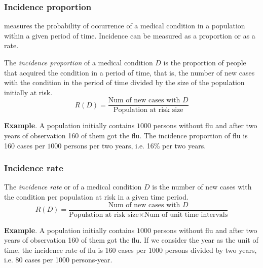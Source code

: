\begin{frame}
\frametitle{Incidence proportion}
 measures the probability of occurrence of a medical condition in a population within a given period of time.
Incidence can be measured as a proportion or as a rate.

\begin{definition}
The \emph{incidence proportion} of a medical condition $D$ is the proportion of people that acquired the condition in a period of time, that is, the number of new cases with the condition in the period of time divided by the size of the population initially at risk.
\[
  R(D)=\frac{\mbox{Num of new cases with $D$}}{\mbox{Population at risk size}}
\]
\end{definition}

\textbf{Example}. A population initially contains $1000$ persons without flu and after two years of observation 160 of them got the flu. 
The incidence proportion of flu is 160 cases per $1000$ persons per two years, i.e. 16\% per two years.
\end{frame}
  

\begin{frame}
\frametitle{Incidence rate}
  
\begin{definition}
The \emph{incidence rate} or of a medical condition $D$ is the number of new cases with the condition per population at risk in a given time period.
\[
  R(D)=\frac{\mbox{Num of new cases with $D$}}{\mbox{Population at risk size}\times \mbox{Num of unit time intervals}}
\]
\end{definition}

\textbf{Example}. A population initially contains $1000$ persons without flu and after two years of observation 160 of them got the flu. 
If we consider the year as the unit of time, the incidence rate of flu is 160 cases per $1000$ persons divided by two years, i.e. 80 cases per 1000 persons-year.
\end{frame}


